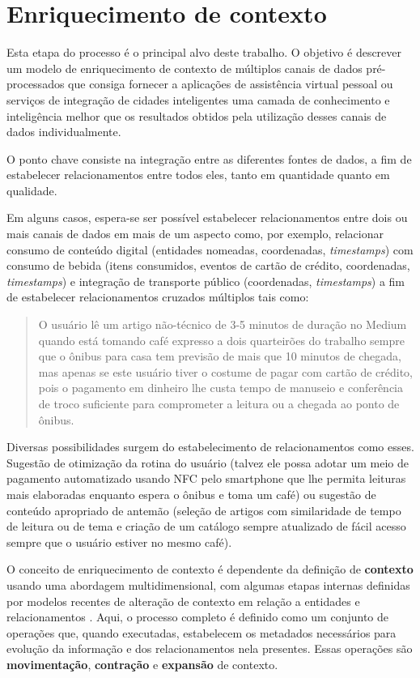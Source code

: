 \chapter{Enriquecimento de contexto} \label{c:enriquecimento_de_contexto}

Esta etapa do processo é o principal alvo deste trabalho. O objetivo é descrever um modelo de enriquecimento de contexto de múltiplos canais de dados pré-processados que consiga fornecer a aplicações de assistência virtual pessoal ou serviços de integração de cidades inteligentes uma camada de conhecimento e inteligência melhor que os resultados obtidos pela utilização desses canais de dados individualmente.

O ponto chave consiste na integração entre as diferentes fontes de dados, a fim de estabelecer relacionamentos entre todos eles, tanto em quantidade quanto em qualidade.

Em alguns casos, espera-se ser possível estabelecer relacionamentos entre dois ou mais canais de dados em mais de um aspecto como, por exemplo, relacionar consumo de conteúdo digital (entidades nomeadas, coordenadas, \textit{timestamps}) com consumo de bebida (itens consumidos, eventos de cartão de crédito, coordenadas, \textit{timestamps}) e integração de transporte público (coordenadas, \textit{timestamps}) a fim de estabelecer relacionamentos cruzados múltiplos tais como:
\begin{quote}
    O usuário lê um artigo não-técnico de 3-5 minutos de duração no Medium quando está tomando café expresso a dois quarteirões do trabalho sempre que o ônibus para casa tem previsão de mais que 10 minutos de chegada, mas apenas se este usuário tiver o costume de pagar com cartão de crédito, pois o pagamento em dinheiro lhe custa tempo de manuseio e conferência de troco suficiente para comprometer a leitura ou a chegada ao ponto de ônibus.
\end{quote}

Diversas possibilidades surgem do estabelecimento de relacionamentos como esses. Sugestão de otimização da rotina do usuário (talvez ele possa adotar um meio de pagamento automatizado usando NFC pelo smartphone que lhe permita leituras mais elaboradas enquanto espera o ônibus e toma um café) ou sugestão de conteúdo apropriado de antemão (seleção de artigos com similaridade de tempo de leitura ou de tema e criação de um catálogo sempre atualizado de fácil acesso sempre que o usuário estiver no mesmo café).

O conceito de enriquecimento de contexto é dependente da definição de \textbf{contexto} usando uma abordagem multidimensional, com algumas etapas internas definidas por modelos recentes de alteração de contexto em relação a entidades e relacionamentos \cite{contextenrichment:multi}. Aqui, o processo completo é definido como um conjunto de operações que, quando executadas, estabelecem os metadados necessários para evolução da informação e dos relacionamentos nela presentes. Essas operações são \textbf{movimentação}, \textbf{contração} e \textbf{expansão} de contexto.

